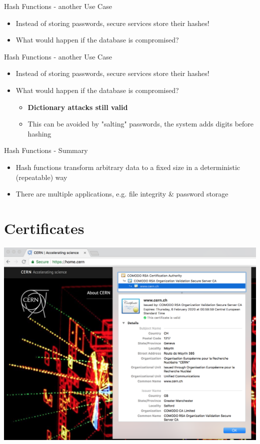 \documentclass[aspectratio=169]{beamer}
\begin{document}
\begin{frame}{Hash Functions - another Use Case}
\begin{itemize}
\item Instead of storing passwords, secure services store their hashes!
\item What would happen if the database is compromised?
\end{itemize}
\end{frame}

\begin{frame}{Hash Functions - another Use Case}
\begin{itemize}
\item Instead of storing passwords, secure services store their hashes!
\item What would happen if the database is compromised?
\begin{itemize}
\item \textbf{Dictionary attacks still valid}
\item This can be avoided by "salting" passwords, the system adds digits before hashing
\end{itemize}
\end{itemize}
\end{frame}

\begin{frame}{Hash Functions - Summary}
\begin{itemize}
\item Hash functions transform arbitrary data to a fixed size in a deterministic (repeatable) way
\item There are multiple applications, e.g. file integrity \& password storage
\end{itemize}
\end{frame}

\section{Certificates}
\frame{\sectionpage}

\begin{frame}
\begin{center}
\includegraphics[width=0.9\linewidth]{cern-certificate.png}
\end{center}
\end{frame}
\end{document}

